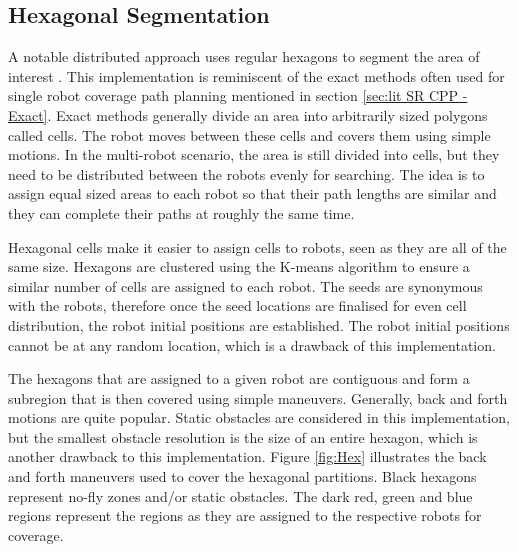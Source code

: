\subsection{Hexagonal Segmentation}
 A notable distributed approach uses regular hexagons to segment the area of interest \cite{Azpurua2018}. This implementation is reminiscent of the exact methods often used for single robot coverage path planning mentioned in section \ref{sec:lit SR CPP - Exact}. Exact methods generally divide an area into arbitrarily sized polygons called cells. The robot moves between these cells and covers them using simple motions. In the multi-robot scenario, the area is still divided into cells, but they need to be distributed between the robots evenly for searching. The idea is to assign equal sized areas to each robot so that their path lengths are similar and they can complete their paths at roughly the same time.

Hexagonal cells make it easier to assign cells to robots, seen as they are all of the same size. Hexagons are clustered using the K-means algorithm to ensure a similar number of cells are assigned to each robot. The seeds are synonymous with the robots, therefore once the seed locations are finalised for even cell distribution, the robot initial positions are established. The robot initial positions cannot be at any random location, which is a drawback of this implementation. 

The hexagons that are assigned to a given robot are contiguous and form a subregion that is then covered using simple maneuvers. Generally, back and forth motions are quite popular. Static obstacles are considered in this implementation, but the smallest obstacle resolution is the size of an entire hexagon, which is another drawback to this implementation. Figure \ref{fig:Hex} illustrates the back and forth maneuvers used to cover the hexagonal partitions. Black hexagons represent no-fly zones and/or static obstacles. The dark red, green and blue regions represent the regions as they are assigned to the respective robots for coverage.

